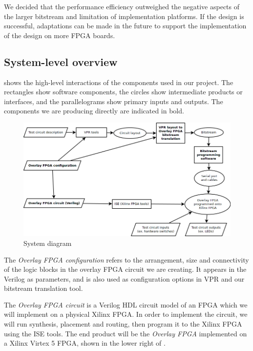 We decided that the performance efficiency outweighed the negative aspects of the larger bitstream and limitation of implementation platforms.
If the design is successful, adaptations can be made in the future to support the implementation of the design on more FPGA boards.



\subsection{System-level overview} %
\label{system-overview}

 shows the high-level interactions of the components used in our project.
The rectangles show software components, the circles show intermediate products or interfaces, and the parallelograms show primary inputs and outputs.
The components we are producing directly are indicated in bold.

\begin{figure}[!h]
	\centering
	\includegraphics[scale=0.5]{system.png}
	\caption{System diagram}
	\label{system-diagram}
\end{figure}

The \emph{Overlay FPGA configuration} refers to the arrangement, size and connectivity of the logic blocks in the overlay FPGA circuit we are creating.
It appears in the Verilog as parameters, and is also used as configuration options in VPR and our bitstream translation tool.

The \emph{Overlay FPGA circuit} is a Verilog HDL circuit model of an FPGA which we will implement on a physical Xilinx FPGA.
In order to implement the circuit, we will run synthesis, placement and routing, then program it to the Xilinx FPGA using the ISE tools.
The end product will be the \emph{Overlay FPGA} implemented on a Xilinx Virtex 5 FPGA, shown in the lower right of .

